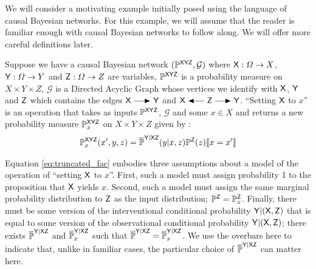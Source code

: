 
We will consider a motivating example initially posed using the language of causal Bayesian networks. For this example, we will assume that the reader is familiar enough with causal Bayesian networks to follow along. We will offer more careful definitions later.

Suppose we have a causal Bayesian network $(\mathbb{P}^{\mathsf{XYZ}},\mathcal{G})$ where $\mathsf{X}:\Omega\to X$, $\mathsf{Y}:\Omega\to Y$ and $\mathsf{Z}:\Omega\to Z$ are variables, $\mathbb{P}^{\mathsf{XYZ}}$ is a probability measure on $X\times Y\times Z$, $\mathcal{G}$ is a Directed Acyclic Graph whose vertices we identify with $\mathsf{X}$, $\mathsf{Y}$ and $\mathsf{Z}$ which contains the edges $\RV{X}\longrightarrowRHD \RV{Y}$ and $\RV{X}\longleftarrowRHD \RV{Z} \longrightarrowRHD \RV{Y}$. ``Setting $\mathsf{X}$ to $x$'' is an operation that takes as inputs $\mathbb{P}^{\mathsf{XYZ}}$, $\mathcal{G}$ and some $x\in X$ and returns a new probability measure $\mathbb{P}_x^{\mathsf{XYZ}}$ on $X\times Y\times Z$ given by \citep[page ~24]{pearl_causality:_2009}:
\begin{align}
    \mathbb{P}^{\mathsf{XYZ}}_{x}(x',y,z)=\overline{\mathbb{P}}^{\mathsf{Y|XZ}}(y|x,z)\mathbb{P}^{\mathsf{Z}}(z)\llbracket x=x' \rrbracket\label{eq:truncated_fac}
\end{align}

Equation \ref{eq:truncated_fac} embodies three assumptions about a model of the operation of ``setting $\mathsf{X}$ to $x$''. First, such a model must assign probability 1 to the proposition that $\mathsf{X}$ yields $x$. Second, such a model must assign the same marginal probability distribution to $\mathsf{Z}$ as the input distribution; $\mathbb{P}^{\mathsf{Z}}=\mathbb{P}_{x}^{\mathsf{Z}}$. Finally, there must be some version of the interventional conditional probability $\mathsf{Y}|(\mathsf{X},\mathsf{Z})$ that is equal to some version of the observational conditional probability $\mathsf{Y}|(\mathsf{X},\mathsf{Z})$; there exists $\overline{\mathbb{P}}^{\mathsf{Y}|\mathsf{XZ}}$ and $\overline{\mathbb{P}}_x^{\mathsf{Y}|\mathsf{XZ}}$ such that $\overline{\mathbb{P}}^{\mathsf{Y}|\mathsf{XZ}}=\overline{\mathbb{P}}_x^{\mathsf{Y}|\mathsf{XZ}}$. We use the overbars here to indicate that, unlike in familiar cases, the particular choice of $\overline{\mathbb{P}}^{\mathsf{Y}|\mathsf{XZ}}$ can matter here.


